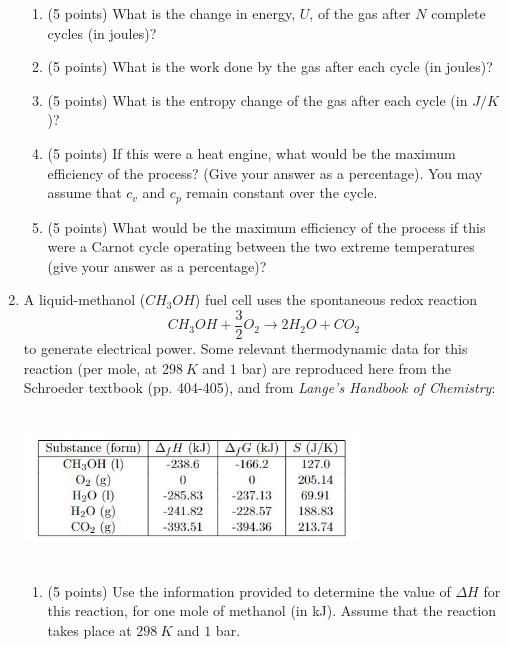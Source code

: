 \documentclass[fleqn]{article}
\begin{document}
\begin{enumerate}
\begin{enumerate}
      \item (5 points) What is the change in energy, $U$, of the gas after $N$ complete cycles (in joules)?
  
      \item (5 points) What is the work done by the gas after each cycle (in joules)?
  
      \item (5 points) What is the entropy change of the gas after each cycle (in $J/K$)?
  
      \item (5 points) If this were a heat engine, what would be the maximum efficiency of the process?
      (Give your answer as a percentage). You may assume that $c_v$ and $c_p$ remain constant over
      the cycle.
  
      \item (5 points) What would be the maximum efficiency of the process if this were a Carnot cycle
      operating between the two extreme temperatures (give your answer as a percentage)?


    \end{enumerate}


    \item A liquid-methanol ($CH_3 OH$) fuel cell uses the spontaneous redox reaction
    $$
      CH_3 OH+\dfrac{3}{2} O_2 \longrightarrow 2H_2 O+CO_2
    $$
    to generate electrical power. Some relevant thermodynamic data for this reaction (per mole, at
    2$98 ~ K$ and $1$ bar) are reproduced here from the Schroeder textbook (pp. 404-405), and from
    \emph{Lange's Handbook of Chemistry}:
    \begin{center}
      \includegraphics[height=4cm, width=9cm]{question7.JPG}
    \end{center}
    \begin{enumerate}
      \item (5 points) Use the information provided to determine the value of $\Delta H$ for this reaction, for
      one mole of methanol (in kJ). Assume that the reaction takes place at $298 ~ K$ and $1$ bar.


\end{enumerate}
\end{enumerate}
\end{document}

